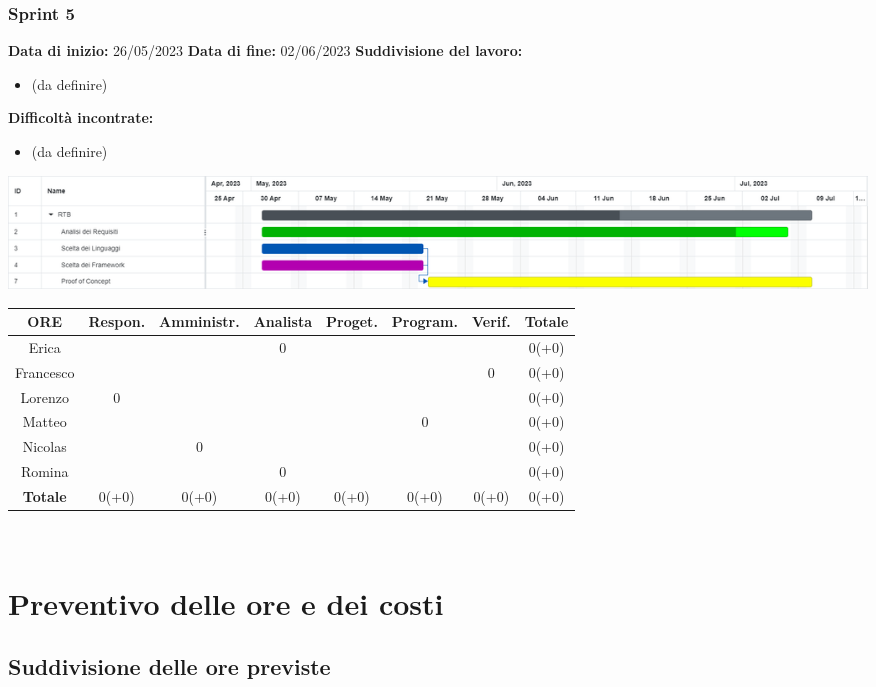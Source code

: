 \documentclass[a4paper, 12pt]{article}
\begin{document}
\subsubsection{Sprint 5}
\textbf{Data di inizio:} 26/05/2023\newline
\textbf{Data di fine:} 02/06/2023\newline
\newline
\textbf{Suddivisione del lavoro:}
\begin{itemize}
    \item (da definire)
\end{itemize}
\textbf{Difficoltà incontrate:}
\begin{itemize}
    \item (da definire)
\end{itemize}
\includegraphics[scale=0.24]{RTB_4.png}\newline
\newline
\begin{tabular}{|c|c|c|c|c|c|c|c|}
    \hline
    \textbf{ORE} & \textbf{Respon.} & \textbf{Amministr.} & \textbf{Analista} & \textbf{Proget.} & \textbf{Program.} & \textbf{Verif.} & \textbf{Totale}\\
    \hline
    Erica & & & 0 & & & & 0(+0)\\
    \hline
    Francesco & & & & & & 0 & 0(+0)\\
    \hline
    Lorenzo & 0 & & & & & & 0(+0)\\
    \hline
    Matteo & & & & & 0 & & 0(+0)\\
    \hline
    Nicolas & & 0 & & & & & 0(+0)\\
    \hline
    Romina & & & 0 & & & & 0(+0)\\
    \hline
    \textbf{Totale} & 0(+0) & 0(+0) & 0(+0) & 0(+0) & 0(+0) & 0(+0) & 0(+0)\\
    \hline
\end{tabular}\\[8pt]

\newpage

\section{Preventivo delle ore e dei costi}

\subsection{Suddivisione delle ore previste}
\end{document}
